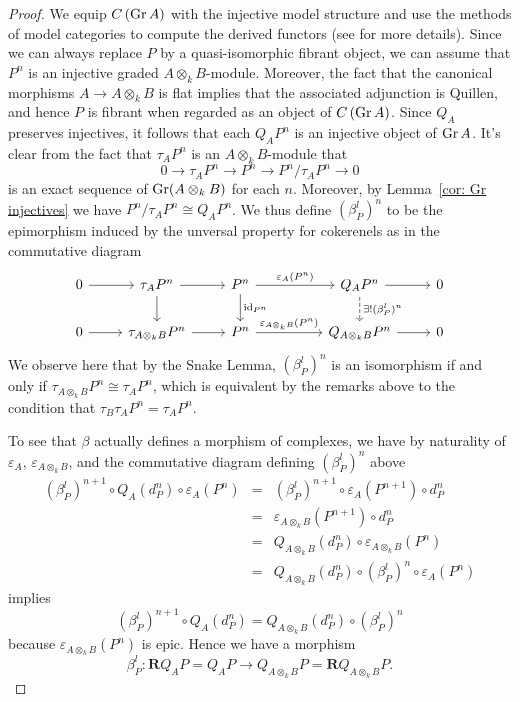 \begin{proof}
  We equip \(C\left(\operatorname{Gr}A\right)\) with the injective model structure and use the methods of model categories to compute the derived functors (see \parencite{Hovey01} for more details).
  Since we can always replace \(P\) by a quasi-isomorphic fibrant object, we can assume that \(P^n\) is an injective graded \(A \otimes_k B\)-module.
  Moreover, the fact that the canonical morphisms \(A \to A \otimes_k B\) is flat implies that the associated adjunction is Quillen, and hence \(P\) is fibrant when regarded as an object of  \(C\left(\operatorname{Gr}A\right)\).
  Since \(Q_A\) preserves injectives, it follows that each \(Q_A P^n\) is an injective object of \(\operatorname{Gr}A\).
  It's clear from the fact that \(\tau_A P^n\) is an \(A \otimes_k B\)-module that   \[0 \to \tau_A P^n \to P^n \to P^n/\tau_A P^n \to 0\]
  is an exact sequence of \(\operatorname{Gr}(A \otimes_k B)\) for each \(n\).
  Moreover, by Lemma~\ref{cor: Gr injectives} we have \(P^n/\tau_A P^n \cong Q_A P^n\).
  We thus define \((\beta^l_P)^n\) to be the epimorphism induced by the unversal property for cokerenels as in the commutative diagram
  \[\begin{tikzcd}
  0 \arrow{r} & \tau_{A} P^n \arrow{d}\arrow{r} & P^n \arrow{d}{\id_{P^n}}\arrow{rr}{\varepsilon_{A}(P^n)} && Q_{A} P^n \arrow{r}\arrow[dashed]{d}{\exists ! (\beta^l_P)^n} & 0\\
  0 \arrow{r} & \tau_{A \otimes_k B} P^n \arrow{r} & P^n\arrow{rr}{\varepsilon_{A \otimes_k B}(P^n)} && Q_{A \otimes_k B} P^n \arrow{r} & 0 
  \end{tikzcd}\]  We observe here that by the Snake Lemma, \((\beta^l_P)^n\) is an isomorphism if and only if \(\tau_{A \otimes_k B} P^n \cong \tau_A P^n\), which is equivalent by the remarks above to the condition that \(\tau_B \tau_A P^n = \tau_A P^n\).

  To see that \(\beta\) actually defines a morphism of complexes, we have by naturality of \(\varepsilon_A\), \(\varepsilon_{A \otimes_k B}\), and the commutative diagram defining \((\beta^l_P)^n\) above 
  \begin{eqnarray*}
    (\beta^l_P)^{n+1} \circ Q_{A}(d^n_{P}) \circ \varepsilon_{A}(P^n)
    &=& (\beta^l_P)^{n+1} \circ \varepsilon_{A}(P^{n+1}) \circ d^n_{P}\\
    &=& \varepsilon_{A \otimes_k B}(P^{n+1}) \circ d^n_{P}\\
    &=& Q_{A \otimes_k B}(d_{P}^n) \circ \varepsilon_{A \otimes_k B}(P^n)\\
    &=& Q_{A \otimes_k B}(d_{P}^n) \circ (\beta^l_P)^n \circ \varepsilon_{A}(P^n)
  \end{eqnarray*}
  implies
  \[(\beta^l_P)^{n+1} \circ Q_{A}(d^n_{P}) = Q_{A \otimes_k B}(d^n_{P}) \circ (\beta^l_P)^n\]
  because \(\varepsilon_{A \otimes_k B}(P^n)\) is epic. Hence we have a morphism
  \[\beta^l_P \colon \mathbf{R}Q_{A} P = Q_{A} P \to Q_{A \otimes_k B} P = \mathbf{R}Q_{A \otimes_k B} P.\]


\end{proof}
